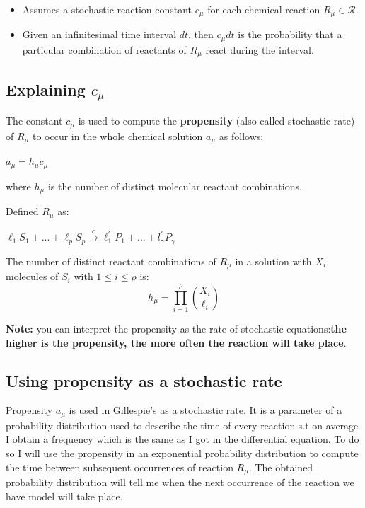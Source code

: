\begin{itemize}
    \item Assumes a stochastic reaction constant $c_{\mu}$ for each chemical reaction $R_{\mu} \in \mathcal{R}$.
    \item Given an infinitesimal time interval $dt$, then $c_{\mu} dt$ is the probability that a particular combination of reactants of $R_{\mu}$ react during the interval.
\end{itemize}

\subsection{Explaining $c_{\mu}$}
The constant $c_{\mu}$ is used to compute the \textbf{propensity} (also called stochastic rate) of $R_{\mu}$ to occur in the whole chemical solution $a_{\mu}$ as follows:
\begin{center}
    $a_{\mu} = h_{\mu} c_{\mu}$
\end{center}

where $h_{\mu}$ is the number of distinct molecular reactant combinations.\par

Defined $R_{\mu}$ as:
\begin{center}
    $\ell_{1} S_{1} + ... + \ell_{p} S_{p} \xrightarrow{c} \ell^{'}_{1} P_{1} + ... + l^{'}_{\gamma} P_{\gamma}$
\end{center}

The number of distinct reactant combinations of $R_{\mu}$ in a solution with $X_{i}$ molecules of $S_{i}$ with $1 \leq i \leq \rho$ is:
\begin{equation*}
    h_{\mu} = \prod^{\rho}_{i = 1} \binom{X_{i}}{\ell_{i}} 
\end{equation*}

\textbf{Note:} you can interpret the propensity as the rate of stochastic equations:\textbf{the higher is the propensity, the more often the reaction will take place}.

\subsection{Using propensity as a stochastic rate}
Propensity $a_{\mu}$ is used in Gillespie's as a stochastic rate. It is a parameter of a probability distribution used to describe the time of every reaction s.t on average I obtain a frequency which is the same as I got in the differential equation. To do so I will use the propensity in an exponential probability distribution to compute the time between subsequent occurrences of reaction $R_{\mu}$. The obtained probability distribution will tell me when the next occurrence of the reaction we have model will take place.

